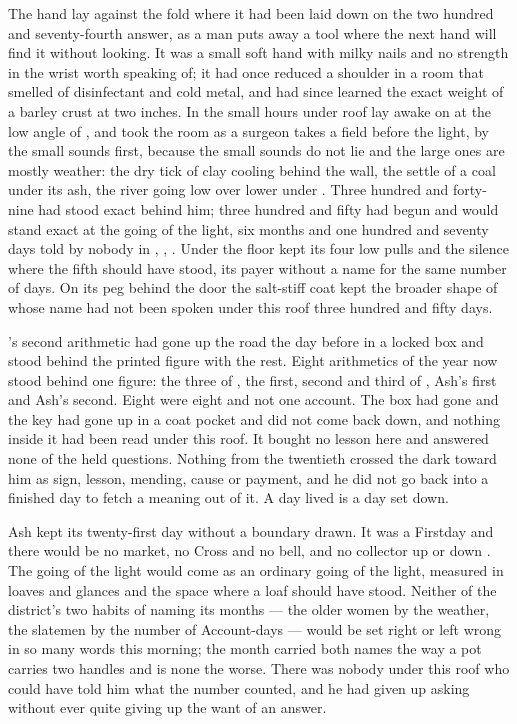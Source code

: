 
The hand lay against the fold where it had been laid down on the two hundred and seventy-fourth answer, as a man puts away a tool where the next hand will find it without looking. It was a small soft hand with milky nails and no strength in the wrist worth speaking of; it had once reduced a shoulder in a room that smelled of disinfectant and cold metal, and had since learned the exact weight of a barley crust at two inches. In the small hours under  roof  lay awake on  at the low angle of , and took the room as a surgeon takes a field before the light, by the small sounds first, because the small sounds do not lie and the large ones are mostly weather: the dry tick of clay cooling behind the wall, the settle of a coal under its ash, the river going low over lower under . Three hundred and forty-nine had stood exact behind him; three hundred and fifty had begun and would stand exact at the going of the light, six months and one hundred and seventy days told by nobody in , , . Under the floor  kept its four low pulls and the silence where the fifth should have stood, its payer without a name for the same number of days. On its peg behind the door the salt-stiff coat kept the broader shape of  whose name had not been spoken under this roof three hundred and fifty days.

's second arithmetic had gone up the road the day before in a locked box and stood behind the printed figure with the rest. Eight arithmetics of the year now stood behind one figure: the three of , the first, second and third of , Ash's first and Ash's second. Eight were eight and not one account. The box had gone and the key had gone up in a coat pocket and did not come back down, and nothing inside it had been read under this roof. It bought no lesson here and answered none of the held questions. Nothing from the twentieth crossed the dark toward him as sign, lesson, mending, cause or payment, and he did not go back into a finished day to fetch a meaning out of it. A day lived is a day set down.

Ash kept its twenty-first day without a boundary drawn. It was a Firstday and there would be no market, no Cross and no bell, and no collector up or down . The going of the light would come as an ordinary going of the light, measured in loaves and glances and the space where a loaf should have stood. Neither of the district's two habits of naming its months --- the older women by the weather, the slatemen by the number of Account-days --- would be set right or left wrong in so many words this morning; the month carried both names the way a pot carries two handles and is none the worse. There was nobody under this roof who could have told him what the number counted, and he had given up asking without ever quite giving up the want of an answer.

